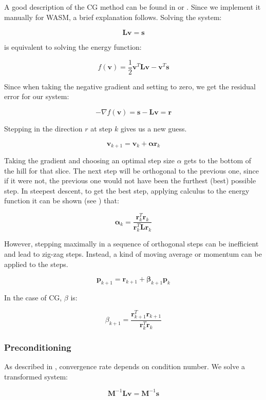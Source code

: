 \documentclass[11pt, a4paper]{article}
\begin{document}
A good description of the CG method can be found in \cite{shewchuk1994introduction} or \cite[Ch. 4]{leveque2007finite}. Since we implement it manually for WASM, a brief explanation follows. Solving the system:

\[
\mathbf{L}\mathbf{v} = \mathbf{s}
\]

is equivalent to solving the energy function:

\[
f(\mathbf{v}) = \frac{1}{2} \mathbf{v}^T \mathbf{L}\mathbf{v} - \mathbf{v}^T\mathbf{s}
\]

Since when taking the negative gradient and setting to zero, we get the residual error for our system:

\[
-\nabla f(\mathbf{v}) = \mathbf{s} - \mathbf{L}\mathbf{v} = \mathbf{r}
\]

Stepping in the direction $r$ at step $k$ gives us a new guess.

\[
\mathbf{v}_{k+1} = \mathbf{v}_{k} + \mathbf{\alpha} \mathbf{r}_k
\]

Taking the gradient and choosing an optimal step size $\alpha$ gets to the bottom of the hill for that slice. The next step will be orthogonal to the previous one, since if it were not, the previous one would not have been the furthest (best) possible step. In steepest descent, to get the best step, applying calculus to the energy function it can be shown (see \cite[Ch. 4]{leveque2007finite}) that:

\[
\mathbf{\alpha}_{k} = \frac{\mathbf{r}_{k}^T \mathbf{r}_k}{\mathbf{r}_k^T \mathbf{L}\mathbf{r}_k}
\]

However, stepping maximally in a sequence of orthogonal steps can be inefficient and lead to zig-zag steps. Instead, a kind of moving average or momentum can be applied to the steps. 

\[
\mathbf{p}_{k+1} = \mathbf{r}_{k+1} + \mathbf{\beta}_{k+1}\mathbf{p}_k
\]

In the case of CG, $\beta$ is:

\[
\beta_{k+1} = \frac{\mathbf{r}^T_{k+1}\mathbf{r}_{k+1}}{\mathbf{r}_{k}^T\mathbf{r}_{k}}
\]


\subsubsection{Preconditioning} 

As described in \cite[Ch. 4.3.4]{leveque2007finite}, convergence rate depends on condition number. We solve a transformed system:

\[
\mathbf{M}^{-1}\mathbf{L}\mathbf{v} = \mathbf{M}^{-1}\mathbf{s}
\] 
\end{document}
